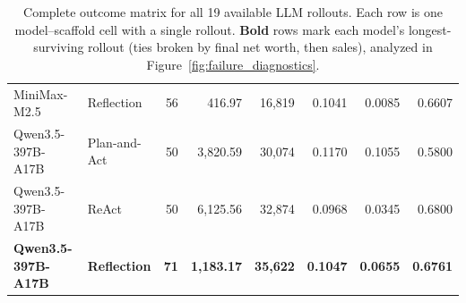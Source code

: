 \begin{table}[t]
{\begin{tabular}{llrrrrrr}
MiniMax-M2.5 & Reflection & 56 & 416.97 & 16,819 & 0.1041 & 0.0085 & 0.6607 \\
Qwen3.5-397B-A17B & Plan-and-Act & 50 & 3,820.59 & 30,074 & 0.1170 & 0.1055 & 0.5800 \\
Qwen3.5-397B-A17B & ReAct & 50 & 6,125.56 & 32,874 & 0.0968 & 0.0345 & 0.6800 \\
\textbf{Qwen3.5-397B-A17B} & \textbf{Reflection} & \textbf{71} & \textbf{1,183.17} & \textbf{35,622} & \textbf{0.1047} & \textbf{0.0655} & \textbf{0.6761} \\
\bottomrule
\end{tabular}
}
\caption{Complete outcome matrix for all 19 available LLM rollouts. Each row is one model--scaffold cell with a single rollout. \textbf{Bold} rows mark each model's longest-surviving rollout (ties broken by final net worth, then sales), analyzed in Figure~\ref{fig:failure_diagnostics}.}
\label{tab:all_run_model_statistics}
\vspace{-2mm}
\end{table}
